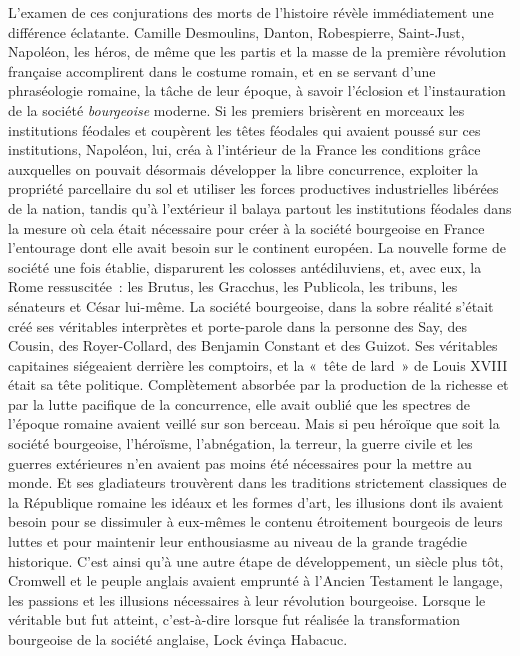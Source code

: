 \documentclass[french,twoside]{book} %
\begin{document}
L’examen de ces conjurations des morts de l’histoire révèle immédiatement une différence éclatante. Camille Desmoulins, Danton, Robespierre, Saint-Just, Napoléon, les héros, de même que les partis et la masse de la première révolution française accomplirent dans le costume romain, et en se servant d’une phraséologie romaine, la tâche de leur époque, à savoir l’éclosion et l’instauration de la société \emph{bourgeoise} moderne. Si les premiers brisèrent en morceaux les institutions féodales et coupèrent les têtes féodales qui avaient poussé sur ces institutions, Napoléon, lui, créa à l’intérieur de la France les conditions grâce auxquelles on pouvait désormais développer la libre concurrence, exploiter la propriété parcellaire du sol et utiliser les forces productives industrielles libérées de la nation, tandis qu’à l’extérieur il balaya partout les institutions féodales dans la mesure où cela était nécessaire pour créer à la société bourgeoise en France l’entourage dont elle avait besoin sur le continent européen. La nouvelle forme de société une fois établie, disparurent les colosses antédiluviens, et, avec eux, la Rome ressuscitée : les Brutus, les Gracchus, les Publicola, les tribuns, les sénateurs et César lui-même. La société bourgeoise, dans la sobre réalité s’était créé ses véritables interprètes et porte-parole dans la personne des Say, des Cousin, des Royer-Collard, des Benjamin Constant et des Guizot. Ses véritables capitaines siégeaient derrière les comptoirs, et la « tête de lard » de Louis XVIII était sa tête politique. Complètement absorbée par la production de la richesse et par la lutte pacifique de la concurrence, elle avait oublié que les spectres de l’époque romaine avaient veillé sur son berceau. Mais si peu héroïque que soit la société bourgeoise, l’héroïsme, l’abnégation, la terreur, la guerre civile et les guerres extérieures n’en avaient pas moins été nécessaires pour la mettre au monde. Et ses gladiateurs trouvèrent dans les traditions strictement classiques de la République romaine les idéaux et les formes d’art, les illusions dont ils avaient besoin pour se dissimuler à eux-mêmes le contenu étroitement bourgeois de leurs luttes et pour maintenir leur enthousiasme au niveau de la grande tragédie historique. C’est ainsi qu’à une autre étape de développement, un siècle plus tôt, Cromwell et le peuple anglais avaient emprunté à l’Ancien Testament le langage, les passions et les illusions nécessaires à leur révolution bourgeoise. Lorsque le véritable but fut atteint, c’est-à-dire lorsque fut réalisée la transformation bourgeoise de la société anglaise, Lock évinça Habacuc.\par
\end{document}
